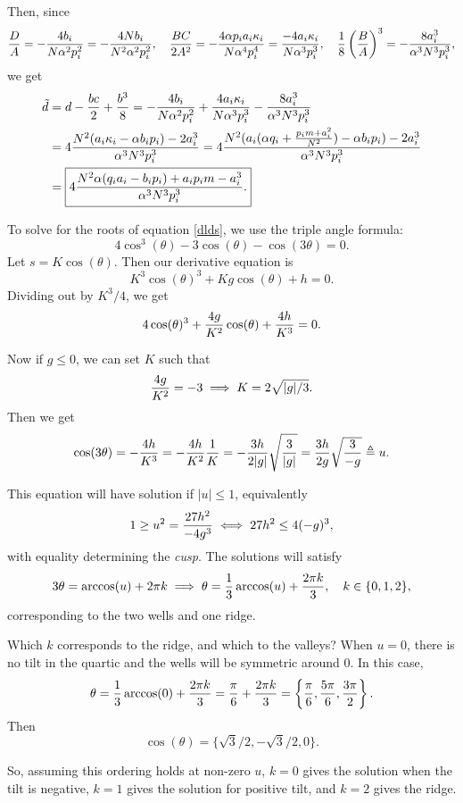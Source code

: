 \documentclass[10pt]{article}
\newcommand{\ka}{\kappa}
\begin{document}
Then, since $${D \over A} = -{4 b_i \over N \alpha^2 p_i^2} = -{4 N b_i \over N^2 \alpha^2 p_i^2}, \quad {BC \over 2 A^2} = -{4 \alpha p_i a_i \ka_i \over N \alpha^4 p_i^4} = {-4 a_i \ka_i \over N \alpha^3 p_i^3}, \quad {1 \over 8} \left({B \over A}\right)^3 = - {8 a_i^3 \over \alpha^3 N^3 p_i^3},$$ we get
\begin{align*}
  \tilde d &= d - {bc \over 2} + {b^3 \over 8} = -{4 b_i \over N \alpha^2 p_i^2} + {4 a_i \ka_i \over N \alpha^3 p_i^3} - {8 a_i^3 \over \alpha^3 N^3 p_i^3}\\
  &= 4{N^2 (a_i \ka_i - \alpha b_i p_i) - 2 a_i^3 \over \alpha^3 N^3 p_i^3} = 4{N^2 (a_i (\alpha q_i + {p_i m + a_i^2 \over N^2}) - \alpha b_i p_i) - 2 a_i^3 \over \alpha^3 N^3 p_i^3} \\
  &= \boxed{4{N^2 \alpha (q_i a_i - b_i p_i) + a_i p_i m -  a_i^3 \over \alpha^3 N^3 p_i^3}.} 
\end{align*}

To solve for the roots of equation \ref{dlds}, we use the triple angle formula: $$ 4 \cos^3(\theta) - 3 \cos(\theta) - \cos(3 \theta) = 0.$$
Let $s = K \cos(\theta).$ Then our derivative equation is $$ K^3 \cos(\theta)^3 + K g \cos(\theta) + h = 0.$$
Dividing out by $K^3/4$, we get $$4 \cos(\theta)^3 + { 4 g \over K^2} \cos(\theta) + {4 h \over K^3} = 0.$$

Now if $g \le 0$, we can set $K$ such that  $${4g \over K^2} = -3 \implies K = 2 \sqrt{|g|/3}.$$ Then we get $$ \cos(3\theta) = -{4 h \over K^3} = -{4 h \over K^2}{ 1 \over K} = -{3 h \over 2 |g|}\sqrt{3 \over |g|} = {3 h \over 2 g} \sqrt{3 \over -g }\triangleq u.$$

This equation will have solution if $|u| \le 1$, equivalently $$ 1 \ge u^2 = {27 h^2 \over -4 g^3} \iff 27 h^2 \le 4(-g)^3,$$ with equality determining the \emph{cusp}. 
The solutions will satisfy 
$$ 3 \theta = \arccos(u) + 2\pi k \implies \theta = {1 \over 3}\arccos(u) + {2 \pi k \over 3}, \quad {k \in \{0,1,2\}},$$ corresponding to the two wells and one ridge.

Which $k$ corresponds to the ridge, and which to the valleys? When $u = 0$, there is no tilt in the quartic and the wells will be symmetric around 0. In this case, $$ \theta = {1 \over 3} \arccos(0) + {2 \pi k \over 3} = {\pi \over 6} + {2 \pi k \over 3} = \left\{ {\pi \over 6}, {5 \pi \over 6}, {3 \pi \over 2} \right \}.$$
Then $$\cos(\theta) = \{\sqrt{3}/2, -\sqrt{3}/2, 0\}.$$

So, assuming this ordering holds at non-zero $u$, $k = 0$ gives the solution when the tilt is negative, $k =1$ gives the solution for positive tilt, and $k = 2$ gives the ridge.
\end{document}
